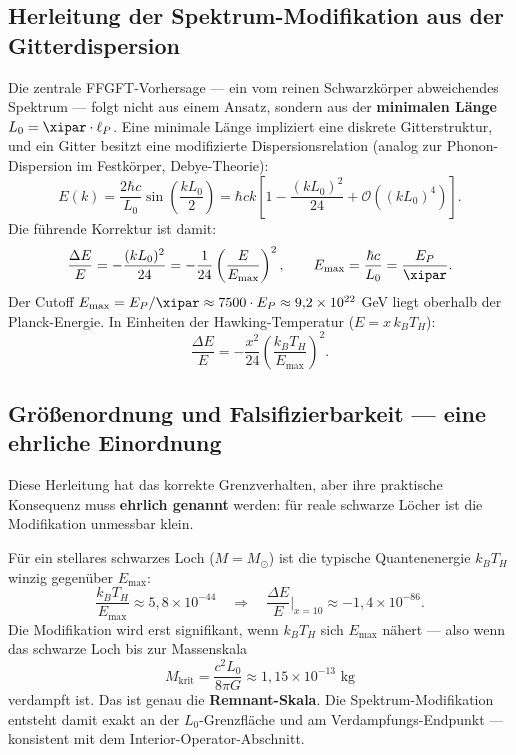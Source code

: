 \subsection{Herleitung der Spektrum-Modifikation aus der Gitterdispersion}

Die zentrale FFGFT-Vorhersage --- ein vom reinen Schwarzkörper abweichendes Spektrum --- folgt nicht aus einem Ansatz, sondern aus der \textbf{minimalen Länge} $L_0 = \xipar \cdot \ell_P$. Eine minimale Länge impliziert eine diskrete Gitterstruktur, und ein Gitter besitzt eine modifizierte Dispersionsrelation (analog zur Phonon-Dispersion im Festkörper, Debye-Theorie):
\begin{equation}
  E(k) = \frac{2\hbar c}{L_0} \sin\!\left(\frac{k L_0}{2}\right)
       = \hbar c k \left[1 - \frac{(k L_0)^2}{24} + \mathcal{O}\!\left((kL_0)^4\right)\right].
\end{equation}
Die führende Korrektur ist damit:
\begin{equation}
  \frac{\Delta E}{E} = -\frac{(k L_0)^2}{24}
  = -\frac{1}{24}\left(\frac{E}{E_\text{max}}\right)^2,
  \qquad E_\text{max} = \frac{\hbar c}{L_0} = \frac{E_P}{\xipar}.
\end{equation}
Der Cutoff $E_\text{max} = E_P/\xipar \approx 7500 \cdot E_P \approx 9{,}2 \times 10^{22}$ GeV liegt oberhalb der Planck-Energie. In Einheiten der Hawking-Temperatur ($E = x \, k_B T_H$):
\begin{equation}
  \frac{\Delta E}{E} = -\frac{x^2}{24}\left(\frac{k_B T_H}{E_\text{max}}\right)^2.
\end{equation}

\subsection{Größenordnung und Falsifizierbarkeit --- eine ehrliche Einordnung}

Diese Herleitung hat das korrekte Grenzverhalten, aber ihre praktische Konsequenz muss \textbf{ehrlich genannt} werden: für reale schwarze Löcher ist die Modifikation unmessbar klein.

Für ein stellares schwarzes Loch ($M = M_\odot$) ist die typische Quantenenergie $k_B T_H$ winzig gegenüber $E_\text{max}$:
\begin{equation}
  \frac{k_B T_H}{E_\text{max}} \approx 5{,}8 \times 10^{-44}
  \quad\Rightarrow\quad
  \frac{\Delta E}{E}\bigg|_{x=10} \approx -1{,}4 \times 10^{-86}.
\end{equation}
Die Modifikation wird erst signifikant, wenn $k_B T_H$ sich $E_\text{max}$ nähert --- also wenn das schwarze Loch bis zur Massenskala
\begin{equation}
  M_\text{krit} = \frac{c^2 L_0}{8\pi G} \approx 1{,}15 \times 10^{-13} \text{ kg}
\end{equation}
verdampft ist. Das ist genau die \textbf{Remnant-Skala}. Die Spektrum-Modifikation entsteht damit exakt an der $L_0$-Grenzfläche und am Verdampfungs-Endpunkt --- konsistent mit dem Interior-Operator-Abschnitt.

